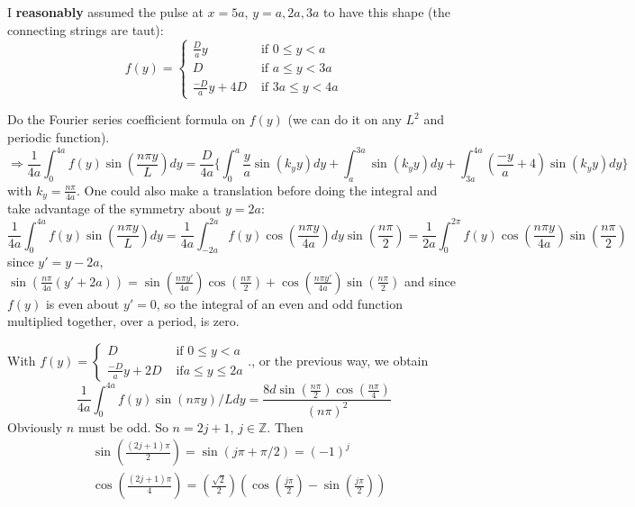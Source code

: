 \documentclass[twoside,10pt]{amsart}
\begin{document}
I \textbf{reasonably} assumed the pulse at $x=5a$, $y=a,2a,3a$ to have this shape (the connecting strings are taut):
\[
f(y) = \begin{cases} \frac{D}{a} y & \text{ if } 0 \leq y < a \\ D & \text{ if } a \leq y < 3a \\ \frac{-D}{a} y + 4D & \text{ if } 3a \leq y < 4a \end{cases} 
\]

Do the Fourier series coefficient formula on $f(y)$ (we can do it on any $L^2$ and periodic function).  
\[
\Longrightarrow \frac{1}{4a} \int_0^{4a} f(y) \sin{ \left( \frac{ n\pi y}{L} \right)} dy = \frac{D}{4a} \{ \int_0^a \frac{y}{a} \sin{ (k_y y) } dy + \int_a^{3a} \sin{(k_y y)} dy + \int_{3a}^{4a} \left( \frac{-y}{a} + 4 \right) \sin{ (k_y y )} dy  \}
\]
with $k_y = \frac{ n\pi}{4a}$.  One could also make a translation before doing the integral and take advantage of the symmetry about $y=2a$:
\[
\frac{1}{4a} \int_0^{4a} f(y) \sin{ \left( \frac{n\pi y}{L} \right) } dy = \frac{1}{4a} \int_{-2a}^{2a} f(y) \cos{ \left( \frac{ n \pi y}{4a} \right) } dy \sin{ \left( \frac{ n \pi }{2} \right) } =\frac{1}{2a} \int_0^{2\pi} f(y) \cos{ \left( \frac{ n \pi y }{4a} \right) } \sin{ \left( \frac{n \pi}{2} \right) }
\]
since $y' = y-2a$, $ \sin{ \left( \frac{ n\pi}{4a} ( y' + 2a) \right) } = \sin{ \left( \frac{ n \pi y'}{4a} \right) } \cos{ \left( \frac{n\pi}{2} \right) } + \cos{ \left( \frac{ n \pi y'}{4a} \right) } \sin{ \left( \frac{ n\pi}{2} \right) }$ and since $f(y)$ is even about $y'=0$, so the integral of an even and odd function multiplied together, over a period, is zero.

With $f(y) = \begin{cases} D & \text{ if } 0 \leq y < a \\ \frac{ -D}{a} y + 2D & \text{ if} a \leq y \leq 2a \end{cases}$., or the previous way, we obtain
\[
\frac{1}{4a} \int_0^{4a} f(y) \sin{(n\pi y)/L} dy  = \frac{ 8d \sin{ \left( \frac{ n \pi }{2} \right) } \cos{ \left( \frac{ n\pi}{4} \right) } }{ (n \pi)^2 }
\]
Obviously $n$ must be odd.  So $n = 2j + 1$, $j\in \mathbb{Z}$.  Then
\[
\begin{aligned}
  & \sin{ \left( \frac{ (2j+1) \pi}{2} \right) } = \sin{ (j\pi + \pi/2 )} = (-1)^j \\ 
  & \cos{ \left( \frac{ (2j+1) \pi}{4} \right) } = \left( \frac{ \sqrt{2}}{2} \right) (\cos{ \left( \frac{j\pi}{2} \right) } - \sin{ \left( \frac{ j\pi}{2} \right) } )
\end{aligned}
\]
\end{document}
